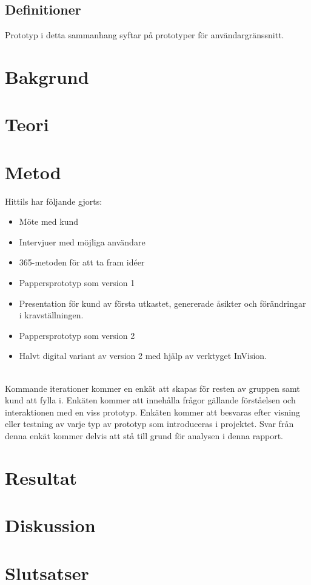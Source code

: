 \documentclass{article}
\begin{document}
\subsection{Definitioner}
Prototyp i detta sammanhang syftar på prototyper för användargränssnitt. 


\section{Bakgrund}
\section{Teori}
\section{Metod}

Hittils har följande gjorts:
\begin{itemize}
	\item Möte med kund
	\item Intervjuer med möjliga användare
	\item 365-metoden för att ta fram idéer
	\item Pappersprototyp som version 1
	\item Presentation för kund av första utkastet, genererade åsikter och förändringar i kravställningen.
	\item Pappersprototyp som version 2
	\item Halvt digital variant av version 2 med hjälp av verktyget InVision.
\end{itemize}
\ \\
Kommande iterationer kommer en enkät att skapas för resten av gruppen samt kund att fylla i. Enkäten kommer att innehålla frågor gällande förståelsen och interaktionen med en viss prototyp. Enkäten kommer att besvaras efter visning eller testning av varje typ av prototyp som introduceras i projektet. Svar från denna enkät kommer delvis att stå till grund för analysen i denna rapport.



\section{Resultat}
\section{Diskussion}
\section{Slutsatser}
\end{document}
